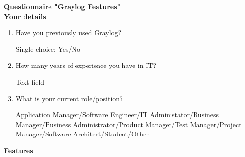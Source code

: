 \documentclass[../main.tex]{subfiles}
\begin{document}
\clearpage

\textbf{Questionnaire "Graylog Features"} \\

\textbf{Your details}

\begin{enumerate}
    \item Have you previously used Graylog? 

    Single choice: Yes/No

    \item How many years of experience you have in IT?

    Text field

    \item What is your current role/position?

    Application Manager/Software Engineer/IT Administator/Business Manager/Business Administrator/Product Manager/Test Manager/Project Manager/Software Architect/Student/Other
\end{enumerate}

\textbf{Features}
\end{document}
